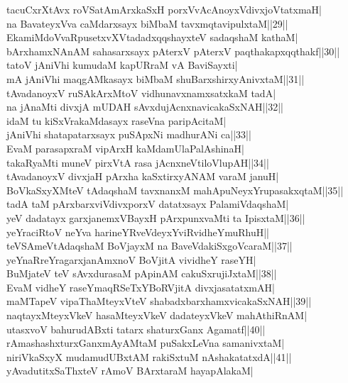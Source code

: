 \documentclass{article}
\begin{document}
tacuCxrXtAvx roVSatAmArxkaSxH porxVvAcAnoyxVdivxjoVtatxmaH|\\
na BavateyxVva caMdarxsayx biMbaM tavxmqtavipulxtaM||29||\\
EkamiMdoVvaRpusetxvXVtadadxqqshayxteV sadaqshaM kathaM|\\
bArxhamxNAnAM sahasarxsayx pAterxV pAterxV paqthakapxqqthakf||30||\\
tatoV jAniVhi kumudaM kapURraM vA BaviSayxti|\\
mA jAniVhi maqgAMkasayx biMbaM shuBarxshirxyAnivxtaM||31||\\
tAvadanoyxV ruSAkArxMtoV vidhunavxnamxsatxkaM tadA|\\
na jAnaMti divxjA mUDAH sAvxdujAcnxnavicakaSxNAH||32||\\
idaM tu kiSxVrakaMdasayx raseVna paripAcitaM|\\
jAniVhi shatapatarxsayx puSApxNi madhurANi ca||33||\\
EvaM parasapxraM vipArxH kaMdamUlaPalAshinaH|\\
takaRyaMti muneV pirxVtA rasa jAcnxneVtiloVlupAH||34||\\
tAvadanoyxV divxjaH pArxha kaSxtirxyANAM varaM januH|\\
BoVkaSxyXMteV tAdaqshaM tavxnanxM mahApuNeyxYrupasakxqtaM||35||\\
tadA taM pArxbarxviVdivxporxV datatxsayx PalamiVdaqshaM|\\
yeV dadatayx garxjanemxVBayxH pArxpunxvaMti ta IpisxtaM||36||\\
yeYraciRtoV neYva harineYRveVdeyxYviRvidheYmuRhuH||\\
teVSAmeVtAdaqshaM BoVjayxM na BaveVdakiSxgoVcaraM||37||\\
yeYnaRreYragarxjanAmxnoV BoVjitA vividheY raseYH|\\
BuMjateV teV sAvxdurasaM pApinAM cakuSxrujiJxtaM||38||\\
EvaM vidheY raseYmaqRSeTxYBoRVjitA divxjasatatxmAH|\\
maMTapeV vipaThaMteyxVteV shabadxbarxhamxvicakaSxNAH||39||\\
naqtayxMteyxVkeV hasaMteyxVkeV dadateyxVkeV mahAthiRnAM|\\
utasxvoV bahurudABxti tatarx shaturxGanx Agamatf||40||\\
rAmashashxturxGanxmAyAMtaM puSakxLeVna samanivxtaM|\\
niriVkaSxyX mudamudUBxtAM rakiSxtuM nAshakatatxdA||41||\\
yAvadutitxSaThxteV rAmoV BArxtaraM hayapAlakaM|\\
\end{document}
